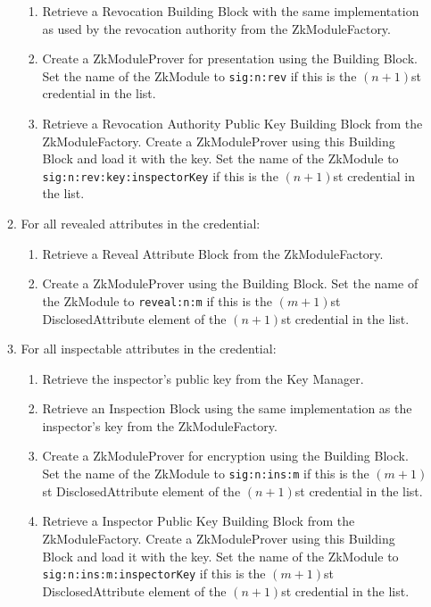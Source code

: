 \begin{enumerate}
\begin{enumerate}
\begin{enumerate}
              \item Retrieve a Revocation Building Block with the same implementation as used by the revocation authority from the ZkModuleFactory.
              \item Create a ZkModuleProver for presentation using the Building Block. Set the name of the ZkModule to
                \texttt{sig:n:rev} if this is the $(n+1)$st credential in the list.
              \item Retrieve a Revocation Authority Public Key Building Block from the ZkModuleFactory.
                Create a ZkModuleProver using this Building Block and load it with the key. Set the name of the ZkModule to
                \texttt{sig:n:rev:key:inspectorKey} if this is the $(n+1)$st credential in the list.
            \end{enumerate}
          \item For all revealed attributes in the credential:
            \begin{enumerate}
              \item Retrieve a Reveal Attribute Block from the ZkModuleFactory.
              \item Create a ZkModuleProver using the Building Block. Set the name of the ZkModule to
                \texttt{reveal:n:m} if this is the $(m+1)$st DisclosedAttribute element of the $(n+1)$st credential in the list.
            \end{enumerate}
          \item For all inspectable attributes in the credential:
            \begin{enumerate}
              \item Retrieve the inspector's public key from the Key Manager.
              \item Retrieve an Inspection Block using the same implementation as the inspector's key from the ZkModuleFactory.
              \item Create a ZkModuleProver for encryption using the Building Block. Set the name of the ZkModule to
                \texttt{sig:n:ins:m} if this is the $(m+1)$st DisclosedAttribute element of the $(n+1)$st credential in the list.
              \item Retrieve a Inspector Public Key Building Block from the ZkModuleFactory.
                Create a ZkModuleProver using this Building Block and load it with the key. Set the name of the ZkModule to
                \texttt{sig:n:ins:m:inspectorKey} if this is the $(m+1)$st DisclosedAttribute element of the $(n+1)$st credential in the list.

\end{enumerate}
\end{enumerate}
\end{enumerate}

